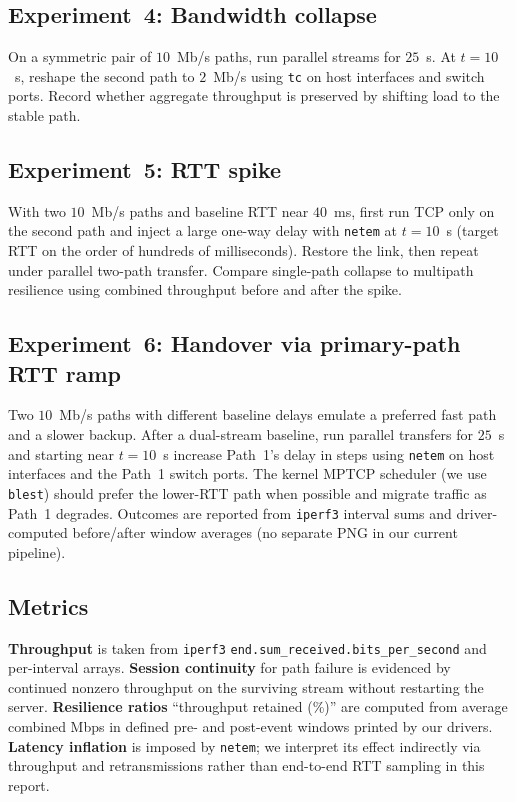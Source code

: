 \subsection{Experiment~4: Bandwidth collapse}
On a symmetric pair of $10$~Mb/s paths, run parallel streams for $25$~s. At $t=10$~s, reshape the second path to $2$~Mb/s using \texttt{tc} on host interfaces and switch ports. Record whether aggregate throughput is preserved by shifting load to the stable path.

\subsection{Experiment~5: RTT spike}
With two $10$~Mb/s paths and baseline RTT near $40$~ms, first run TCP only on the second path and inject a large one-way delay with \texttt{netem} at $t=10$~s (target RTT on the order of hundreds of milliseconds). Restore the link, then repeat under parallel two-path transfer. Compare single-path collapse to multipath resilience using combined throughput before and after the spike.

\subsection{Experiment~6: Handover via primary-path RTT ramp}
Two $10$~Mb/s paths with different baseline delays emulate a preferred fast path and a slower backup. After a dual-stream baseline, run parallel transfers for $25$~s and starting near $t=10$~s increase Path~1's delay in steps using \texttt{netem} on host interfaces and the Path~1 switch ports. The kernel MPTCP scheduler (we use \texttt{blest}) should prefer the lower-RTT path when possible and migrate traffic as Path~1 degrades. Outcomes are reported from \texttt{iperf3} interval sums and driver-computed before/after window averages (no separate PNG in our current pipeline).

\subsection{Metrics}
\textbf{Throughput} is taken from \texttt{iperf3} \texttt{end.sum\_received.bits\_per\_second} and per-interval arrays. \textbf{Session continuity} for path failure is evidenced by continued nonzero throughput on the surviving stream without restarting the server. \textbf{Resilience ratios} ``throughput retained (\%)'' are computed from average combined Mbps in defined pre- and post-event windows printed by our drivers. \textbf{Latency inflation} is imposed by \texttt{netem}; we interpret its effect indirectly via throughput and retransmissions rather than end-to-end RTT sampling in this report.
